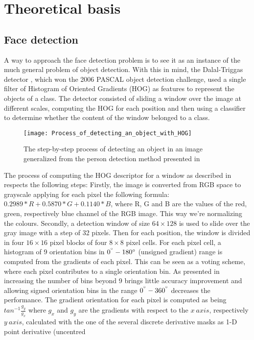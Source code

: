 \chapter{Theoretical basis}

\section{Face detection}
A way to approach the face detection problem is to see it as an instance of the much general problem of object detection. With this in mind, the Dalal-Triggas detector \cite{DalalTriggs05}, which won the 2006 PASCAL object detection challenge, used a single filter of Histogram of Oriented Gradients (HOG) as features to represent the objects of a class. The detector consisted of sliding a window over the image at different scales, computing the HOG for each position and then using a classifier to determine whether the content of the window belonged to a class.
\begin{figure}[h]
	\begin{center}
		\texttt{[image: Process\_of\_detecting\_an\_object\_with\_HOG]}
	\end{center}
	\caption[Process flow of detecting an object in an image]{The step-by-step process of detecting an object in an image generalized from the person detection method presented in \cite{DalalTriggs05}}
\end{figure}
The process of computing the HOG descriptor for a window as described in \cite{DalalTriggs05} respects the following steps: 
Firstly, the image is converted from RGB space to grayscale applying for each pixel the following formula: $0.2989 * R + 0.5870 * G + 0.1140 * B$, where R, G and B are the values of the red, green, respectively blue channel of the RGB image.	This way we're normalizing the colours. 
Secondly, a detection window of size $64\times128$ is used to slide over the gray image with a step of 32 pixels.
Then for each position, the window is divided in four $16\times16$ pixel blocks of four $8\times8$ pixel cells.
For each pixel cell, a histogram of 9 orientation bins in $0^{\degree}-180{\degree}$ (unsigned gradient) range is computed from the gradients of each pixel. This can be seen as a voting scheme, where each pixel contributes to a single orientation bin. As presented in \cite{DalalTriggs05} increasing the number of bins beyond 9 brings little accuracy improvement and allowing signed orientation bins in the range $0^{\degree}-360^{\degree}$ decreases the performance.
The gradient orientation for each pixel is computed as being $tan^{-1}\frac{g_{y}}{g_{x}}$ where $g_{x}$ and $g_{y}$ are the gradients with respect to the $x\ axis$, respectively $y\ axis$, calculated with the one of the several discrete derivative masks as 1-D point derivative (uncentred 
